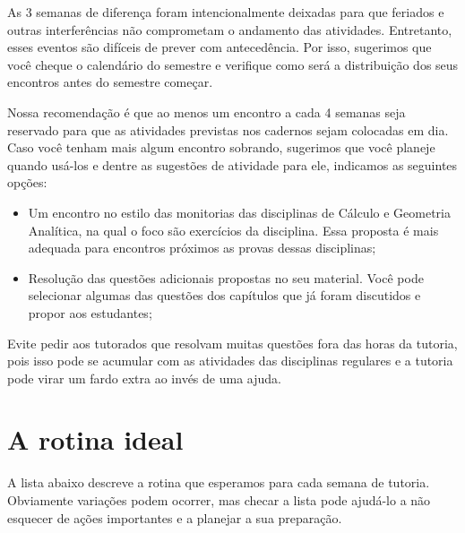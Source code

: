 \documentclass[openany]{book}
\begin{document}
As 3 semanas de diferença foram intencionalmente deixadas para que feriados e outras interferências não comprometam o andamento das atividades. Entretanto, esses eventos são difíceis de prever com antecedência. Por isso, sugerimos que você cheque o calendário do semestre e verifique como será a distribuição dos seus encontros antes do semestre começar.

Nossa recomendação é que ao menos um encontro a cada 4 semanas seja reservado para que as atividades previstas nos cadernos sejam colocadas em dia. Caso você tenham mais algum encontro sobrando, sugerimos que você planeje quando usá-los e dentre as sugestões de atividade para ele, indicamos as seguintes opções:

\begin{itemize}
 \item Um encontro no estilo das monitorias das disciplinas de Cálculo e Geometria Analítica, na qual o foco são exercícios da disciplina. Essa proposta é mais adequada para encontros próximos as provas dessas disciplinas;
 \item Resolução das questões adicionais propostas no seu material. Você pode selecionar algumas das questões dos capítulos que já foram discutidos e propor aos estudantes;
\end{itemize}

Evite pedir aos tutorados que resolvam muitas questões fora das horas da tutoria, pois isso pode se acumular com as atividades das disciplinas regulares e a tutoria pode virar um fardo extra ao invés de uma ajuda.

\section{A rotina ideal}

A lista abaixo descreve a rotina que esperamos para cada semana de tutoria. Obviamente variações podem ocorrer, mas checar a lista pode ajudá-lo a não esquecer de ações importantes e a planejar a sua preparação.
\end{document}
